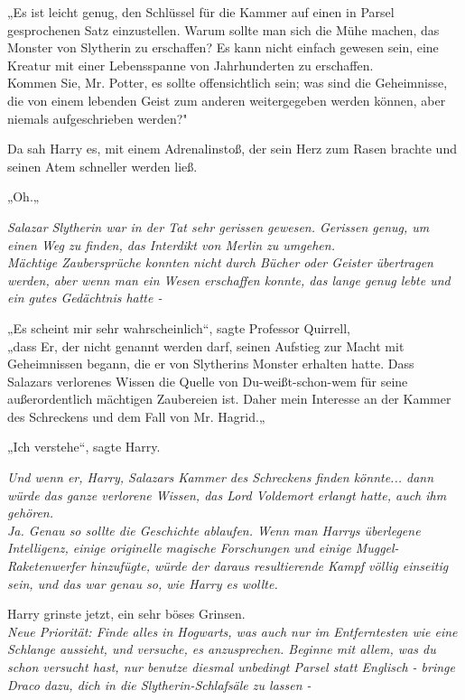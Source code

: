 {„Es ist leicht genug, den Schlüssel für die Kammer auf einen in Parsel gesprochenen Satz einzustellen. Warum sollte man sich die Mühe machen, das Monster von Slytherin zu erschaffen? Es kann nicht einfach gewesen sein, eine Kreatur mit einer Lebensspanne von Jahrhunderten zu erschaffen.\\ Kommen Sie, Mr. Potter, es sollte offensichtlich sein; was sind die Geheimnisse, die von einem lebenden Geist zum anderen weitergegeben werden können, aber niemals aufgeschrieben werden?"

Da sah Harry es, mit einem Adrenalinstoß, der sein Herz zum Rasen brachte und seinen Atem schneller werden ließ.

„Oh.„

\emph{Salazar Slytherin war in der Tat sehr gerissen gewesen. Gerissen genug, um einen Weg zu finden, das Interdikt von Merlin zu umgehen.}\\ \emph{Mächtige Zaubersprüche konnten nicht durch Bücher oder Geister übertragen werden, aber wenn man ein Wesen erschaffen konnte, das lange genug lebte und ein gutes Gedächtnis hatte -}

„Es scheint mir sehr wahrscheinlich“, sagte Professor Quirrell,\\ „dass Er, der nicht genannt werden darf, seinen Aufstieg zur Macht mit Geheimnissen begann, die er von Slytherins Monster erhalten hatte. Dass Salazars verlorenes Wissen die Quelle von Du-weißt-schon-wem für seine außerordentlich mächtigen Zaubereien ist. Daher mein Interesse an der Kammer des Schreckens und dem Fall von Mr. Hagrid.„

„Ich verstehe“, sagte Harry.

\emph{Und wenn er, Harry, Salazars Kammer des Schreckens finden könnte... dann würde das ganze verlorene Wissen, das Lord Voldemort erlangt hatte, auch ihm gehören.\\ Ja. Genau so sollte die Geschichte ablaufen. Wenn man Harrys überlegene Intelligenz, einige originelle magische Forschungen und einige Muggel-Raketenwerfer hinzufügte, würde der daraus resultierende Kampf völlig einseitig sein, und das war genau so, wie Harry es wollte.}

Harry grinste jetzt, ein sehr böses Grinsen.\\ \emph{Neue Priorität: Finde alles in Hogwarts, was auch nur im Entferntesten wie eine Schlange aussieht, und versuche, es anzusprechen. Beginne mit allem, was du schon versucht hast, nur benutze diesmal unbedingt Parsel statt Englisch - bringe Draco dazu, dich in die Slytherin-Schlafsäle zu lassen -}

}
